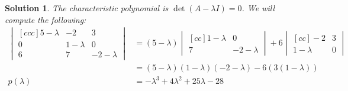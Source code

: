 \documentclass[11pt]{scrartcl}
\theoremstyle{dotlessP}
\newtheorem{sol}{Solution}[section]
\theoremstyle{dotlessN}
\begin{document}
\begin{sol}
	The characteristic polynomial is $\det(A - \lambda I) = 0$. We will compute the following:
	\begin{align*}
		\begin{vmatrix}[ccc]
			5 - \lambda & -2 & 3 \\
			0 & 1 - \lambda & 0 \\
			6 & 7 & -2 - \lambda
		\end{vmatrix} &= (5-\lambda)
		\begin{vmatrix}[cc]
			1 - \lambda & 0 \\
			7 & -2 - \lambda
		\end{vmatrix} + 6
		\begin{vmatrix}[cc]
			-2 & 3 \\
			1-\lambda & 0
		\end{vmatrix} \\
		&= (5-\lambda)(1-\lambda)(-2-\lambda) - 6(3(1-\lambda)) \\
	p(\lambda)	&= -\lambda^3 + 4\lambda^2 + 25\lambda - 28
	\end{align*}
\end{sol}
\end{document}
